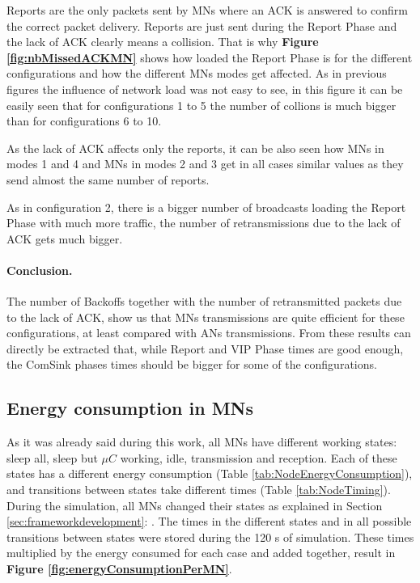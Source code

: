 Reports are the only packets sent by \acp{MN} where an \ac{ACK} is answered to confirm the correct packet delivery. Reports are just sent during the
Report Phase and the lack of \ac{ACK} clearly means a collision. That is why \textbf{Figure \ref{fig:nbMissedACKMN}} shows how loaded the Report Phase is
for the different configurations and how the different \acp{MN} modes get affected. As in previous figures the influence of network load was not easy to
see, in this figure it can be easily seen that for configurations 1 to 5 the number of collions is much bigger than for configurations 6 to 10.

As the lack of \ac{ACK} affects only the reports, it can be also seen how \acp{MN} in modes 1 and 4 and \acp{MN} in modes 2 and 3 get in all cases similar
values as they send almost the same number of reports.

As in configuration 2, there is a bigger number of broadcasts loading the Report Phase with much more traffic, the number of retransmissions due to 
the lack of \ac{ACK} gets much bigger.

\paragraph{Conclusion.} The number of Backoffs together with the number of retransmitted packets due to the lack of ACK, show us that \acp{MN} transmissions 
are quite efficient for these configurations, at least compared with \acp{AN} transmissions. From these results can directly be extracted that, while 
Report and VIP Phase times are good enough, the ComSink phases times should be bigger for some of the configurations.

\subsection{Energy consumption in \acp{MN}}

As it was already said during this work, all \acp{MN} have different working states: sleep all, sleep but $\mu C$ working, idle, transmission and 
reception. Each of these states has a different energy consumption (Table \ref{tab:NodeEnergyConsumption}), and transitions between states take 
different times (Table \ref{tab:NodeTiming}). During the simulation, all \acp{MN} changed their states as explained in Section 
\ref{sec:frameworkdevelopment}: . The times in the different states and in all possible transitions between states were stored
during the 120 s of simulation. These times multiplied by the energy consumed for each case and added together, result in \textbf{Figure \ref{fig:energyConsumptionPerMN}}.

